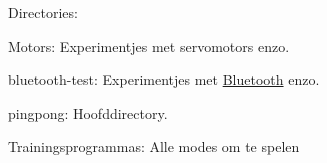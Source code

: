 Directories\+:
\begin{DoxyItemize}
\item {\ttfamily Motors}\+: Experimentjes met servomotors enzo.
\item {\ttfamily bluetooth-\/test}\+: Experimentjes met \mbox{\hyperlink{namespace_bluetooth}{Bluetooth}} enzo.
\item {\ttfamily pingpong}\+: Hoofddirectory.
\item {\ttfamily Trainingsprogramma\textquotesingle{}s}\+: Alle modes om te spelen 
\end{DoxyItemize}